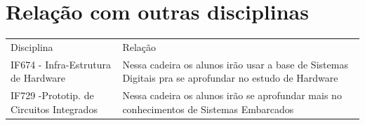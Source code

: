 \documentclass[a4paper,10pt]{extarticle}
\begin{document}
\section{Relação com outras disciplinas}
\begin{table}[h]
 \centering
 {\renewcommand\arraystretch{1.25}
 \begin{tabular}{ l l }
  \cline{1-1}\cline{2-2}  
    \multicolumn{1}{|p{3.850cm}|}{Disciplina \centering } &
    \multicolumn{1}{p{4.217cm}|}{Relação \centering }
  \\  
  \cline{1-1}\cline{2-2}  
    \multicolumn{1}{|p{3.850cm}|}{IF674 - Infra-Estrutura de Hardware} &
    \multicolumn{1}{p{4.217cm}|}{Nessa cadeira os alunos irão usar a base de Sistemas Digitais pra se aprofundar no estudo de Hardware}
  \\  
  \cline{1-1}\cline{2-2}  
    \multicolumn{1}{|p{3.850cm}|}{IF729 -Prototip. de Circuitos Integrados} &
    \multicolumn{1}{p{4.217cm}|}{Nessa cadeira os alunos irão se aprofundar mais no conhecimentos de Sistemas Embarcados}
  \\ 
  \hline

 \end{tabular} }
\end{table}




\end{document}

